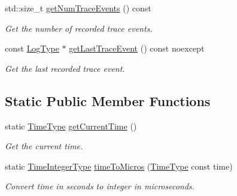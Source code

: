 \begin{DoxyCompactItemize}
std\+::size\+\_\+t \hyperlink{structvt_1_1trace_1_1_trace_lite_a01b746338f535ac1df0566f9705e2d1e}{get\+Num\+Trace\+Events} () const
\begin{DoxyCompactList}\small\item\em Get the number of recorded trace events. \end{DoxyCompactList}\item 
const \hyperlink{structvt_1_1trace_1_1_trace_lite_aeb73e523d31829d3163c877b145afa2a}{Log\+Type} $\ast$ \hyperlink{structvt_1_1trace_1_1_trace_lite_a356f20b9186cf0ed1fdc9881186c9f49}{get\+Last\+Trace\+Event} () const noexcept
\begin{DoxyCompactList}\small\item\em Get the last recorded trace event. \end{DoxyCompactList}\end{DoxyCompactItemize}
\subsection*{Static Public Member Functions}
\begin{DoxyCompactItemize}
\item 
static \hyperlink{namespacevt_a2b9f28078dc309ad0706b69ded743e69}{Time\+Type} \hyperlink{structvt_1_1trace_1_1_trace_lite_a5ddfc40d8206946d33630d4b81b6126c}{get\+Current\+Time} ()
\begin{DoxyCompactList}\small\item\em Get the current time. \end{DoxyCompactList}\item 
static \hyperlink{structvt_1_1trace_1_1_trace_lite_a301955b0e2e8d76ca5974c10be8125c4}{Time\+Integer\+Type} \hyperlink{structvt_1_1trace_1_1_trace_lite_a89d749168b5517b592b0603c594e6fdf}{time\+To\+Micros} (\hyperlink{namespacevt_a2b9f28078dc309ad0706b69ded743e69}{Time\+Type} const time)
\begin{DoxyCompactList}\small\item\em Convert time in seconds to integer in microseconds. \end{DoxyCompactList}\end{DoxyCompactItemize}
